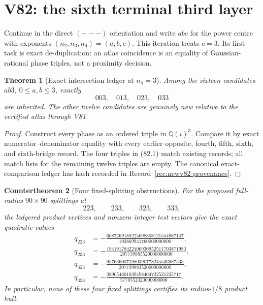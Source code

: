 \documentclass[11pt,oneside]{article}
\newtheorem{theorem}{Theorem}[section]
\newtheorem{countertheorem}[theorem]{Countertheorem}
\theoremstyle{definition}
\theoremstyle{remark}
\begin{document}
\section{V82: the sixth terminal third layer}
\label{sec:newv82-sixth-terminal-layer}

Continue in the direct \((---)\) orientation and write \(abc\) for
the power centre with exponents \((n_2,n_3,n_4)=(a,b,c)\).  This
iteration treats \(c=3\).  Its first task is exact de-duplication:
an atlas coincidence is an equality of Gaussian-rational phase
triples, not a proximity decision.

\begin{theorem}[Exact intersection ledger at \(n_4=3\)]
\label{thm:newv82-intersection}
Among the sixteen candidates \(ab3\), \(0\leq a,b\leq3\), exactly
\[
 003,\quad013,\quad023,\quad033                         \tag{82.1}
\]
are inherited.  The other twelve candidates are genuinely new
relative to the certified atlas through V81.
\end{theorem}

\begin{proof}
Construct every phase as an ordered triple in
\(\mathbb Q(i)^3\).  Compare it by exact numerator--denominator
equality with every earlier opposite, fourth, fifth, sixth, and
sixth-bridge record.  The four triples in (82.1) match existing
records; all match lists for the remaining twelve triples are empty.
The canonical exact-comparison ledger has hash recorded in
Record~\ref{rec:newv82-provenance}.
\end{proof}

\begin{countertheorem}[Four fixed-splitting obstructions]
\label{ctr:newv82-four-failures}
For the proposed full-radius \(90\times90\) splittings at
\[
 223,\qquad233,\qquad323,\qquad333,                     \tag{82.2}
\]
the ledgered product vertices and nonzero integer test vectors give
the exact quadratic values
\[
\begin{aligned}
q_{223}&=-\frac{6687269188225698808121554987147}
                 {103869941760000000000},\\
q_{233}&=-\frac{19419178422406930952511703871983}
                 {207739883520000000000},\\
q_{323}&=-\frac{9576360071980390778245536987533}
                 {207739883520000000000},\\
q_{333}&=-\frac{389054601039498404722521235717}
                 {5770552320000000000}.
\end{aligned}                                           \tag{82.3}
\]
In particular, none of these four fixed splittings certifies its
radius-\(1/8\) product hull.
\end{countertheorem}
\end{document}
